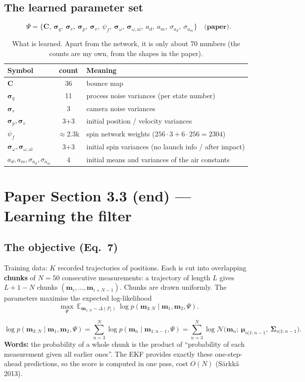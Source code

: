 \documentclass[11pt,a4paper]{article}
\newcommand{\mm}{\mathbf{m}}
\newcommand{\mmu}{\boldsymbol{\mu}}
\newcommand{\SSigma}{\boldsymbol{\Sigma}}
\begin{document}
\subsection{The learned parameter set}
\[
\Psi=\{\mathbf C,\ \boldsymbol\sigma_q,\ \boldsymbol\sigma_r,\ \boldsymbol\sigma_p,\ \boldsymbol\sigma_v,\ \psi_f,\ \boldsymbol\sigma_\omega,\ \boldsymbol\sigma_{\omega,\text{ai}},\ a_d,\ a_m,\ \sigma_{a_d},\ \sigma_{a_m}\}\quad\textbf{(paper)}.
\]
\begin{table}[htbp]
\centering\small\renewcommand{\arraystretch}{1.2}
\begin{tabularx}{\textwidth}{@{}l c X@{}}
\toprule
Symbol & count & Meaning \\
\midrule
$\mathbf C$ & 36 & bounce map \\
$\boldsymbol\sigma_q$ & 11 & process noise variances (per state number) \\
$\boldsymbol\sigma_r$ & 3 & camera noise variances \\
$\boldsymbol\sigma_p,\boldsymbol\sigma_v$ & 3+3 & initial position / velocity variances \\
$\psi_f$ & $\approx$2.3k & spin network weights ($256\cdot3+6\cdot256=2304$) \\
$\boldsymbol\sigma_\omega,\boldsymbol\sigma_{\omega,\text{ai}}$ & 3+3 & initial spin variances (no launch info / after impact) \\
$a_d,a_m,\sigma_{a_d},\sigma_{a_m}$ & 4 & initial means and variances of the air constants \\
\bottomrule
\end{tabularx}
\caption{What is learned. Apart from the network, it is only about 70 numbers (the counts are my own, from the shapes in the paper).}
\end{table}

\section{Paper Section 3.3 (end) --- Learning the filter}
\subsection{The objective (Eq.~7)}
Training data: $K$ recorded trajectories of positions. Each is cut into overlapping \textbf{chunks} of $N=50$ consecutive measurements:
a trajectory of length $L$ gives $L+1-N$ chunks $(\mm_i,\dots,\mm_{i+N-1})$. Chunks are drawn uniformly. The parameters maximise the expected log-likelihood
\[
\max_\Psi\ \mathbb E_{\mm_{1:N}\sim\Delta(P_c)}\ \log p(\mm_{3:N}\mid\mm_1,\mm_2,\Psi).
\]
\begin{eqbox}
\[
\log p(\mm_{3:N}\mid\mm_1,\mm_2,\Psi)=\sum_{n=3}^N\log p(\mm_n\mid\mm_{1:n-1},\Psi)=\sum_{n=3}^N\log\mathcal N\big(\mm_n;\ \mmu_{n|1:n-1},\ \SSigma_{n|1:n-1}\big).
\]
\textbf{Words:} the probability of a whole chunk is the product of ``probability of each measurement given all earlier ones''. The EKF provides exactly these one-step-ahead predictions, so the score is computed in one pass, cost $O(N)$ (Särkkä 2013).
\end{eqbox}
\end{document}
